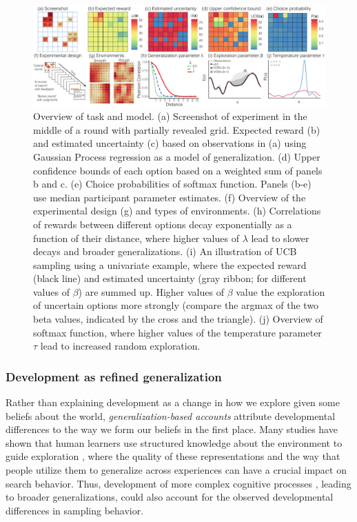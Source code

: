 \documentclass[a4paper,man, floatsintext, natbib]{apa6}
\begin{document}
\begin{figure}[ht!]
\centering
\includegraphics[width=\linewidth]{modelOverviewpaper.pdf}
\caption{Overview of task and model. (a) Screenshot of experiment in the middle of a round with partially revealed grid. Expected reward (b) and estimated uncertainty (c) based on observations in (a) using Gaussian Process regression as a model of generalization. (d) Upper confidence bounds of each option based on a weighted sum of panels b and c. (e) Choice probabilities of softmax function. Panels (b-e) use median participant parameter estimates. (f) Overview of the experimental design (g) and types of environments. (h) Correlations of rewards between different options decay exponentially as a function of their distance, where higher values of $\lambda$ lead to slower decays and broader generalizations. (i) An illustration of UCB sampling using a univariate example, where the expected reward (black line) and estimated uncertainty (gray ribbon; for different values of $\beta$) are summed up. Higher values of $\beta$ value the exploration of uncertain options more strongly (compare the argmax of the two beta values, indicated by the cross and the triangle). (j) Overview of softmax function, where higher values of the temperature parameter $\tau$ lead to increased random exploration.}
\label{fig:gpucboverview}
\end{figure}


\subsubsection{Development as refined generalization} 
Rather than explaining development as a change in how we explore given some beliefs about the world, \emph{generalization-based accounts} attribute developmental differences to the way we form our beliefs in the first place. Many studies have shown that human learners use structured knowledge about the environment to guide exploration \citep{schulz2017putting}, where the quality of these representations and the way that people utilize them to generalize across experiences can have a crucial impact on search behavior. Thus, development of more complex cognitive processes \citep{Blanco2016}, leading to broader generalizations, could also account for the observed developmental differences in sampling behavior.
\end{document}
